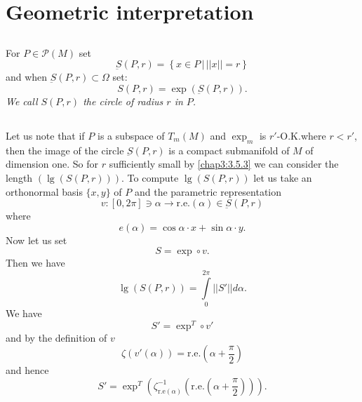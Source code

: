 \section{Geometric interpretation}\pageoriginale

\subsection{}\label{chap6:6.3.1}

\begin{defi*}
For $P\in\mathscr{P}(M)$ set
$$
\underbar{S}(P,r)=\left\{x\in P \,\big|\, ||x||=r\right\}
$$
and when $\underbar{S}(P,r)\subset\Omega$ set:
$$
S(P,r)=\exp(\underbar{S}(P,r)).
$$
{\em We call $S(P,r)$ the circle of radius $r$ in $P$.}
\end{defi*}

\subsection{}\label{chap6:6.3.2}

\begin{note*}
Let us note that if $P$ is a subspace of $T_{m}(M)$ and $\exp_{m}$ is
$r'$-O.K.\@ where $r<r'$, then the image of the circle
$\underbar{S}(P,r)$ is a compact submanifold of $M$ of dimension
one. So for $r$ sufficiently small by \ref{chap3:3.5.3} we can consider
the length $(\lg(S(P,r)))$. To compute $\lg(S(P,r))$ let us take an
orthonormal basis $\{x,y\}$ of $P$ and the parametric representation
\begin{equation*}
v:[0,2\pi]\ni \alpha\to
\text{r.e.}(\alpha)\in\underbar{S}(P,r)\tag{6.3.3}\label{chap6:6.3.3} 
\end{equation*}
where
$$
e(\alpha)=\cos\alpha\cdot x+\sin\alpha\cdot y.
$$
Now let us set
\begin{equation*}
S=\exp \circ v.\tag{6.3.4}\label{chap6:6.3.4}
\end{equation*}
Then we have
\begin{equation*}
\lg(S(P,r))=\int\limits^{2\pi}_{0}||S'||d\alpha.\tag{6.3.5}\label{chap6:6.3.5}
\end{equation*}
We have 
$$
S'=\exp^{T}\circ v'
$$
and by the definition of $v$
$$
\zeta(v'(\alpha))=\text{r.e.}\left(\alpha+\frac{\pi}{2}\right)
$$
and hence
\begin{equation*}
S'=\exp^{T}\left(\zeta^{-1}_{\text{r.e}(\alpha)}\left(\text{r.e.}\left(\alpha+
\frac{\pi}{2}\right)\right)\right).\tag{6.3.6}\label{chap6:6.3.6}    
\end{equation*}
\end{note*}

